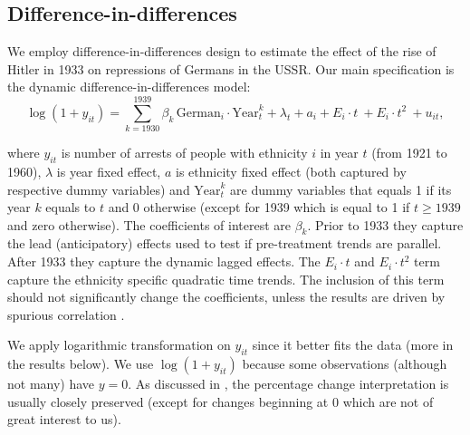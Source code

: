 \subsection{Difference-in-differences}
We employ difference-in-differences design to estimate the effect of the rise of Hitler in 1933 on repressions of Germans in the USSR. 
Our main specification is the dynamic difference-in-differences model:
\begin{equation}
 \log\left(1 + y_{it}\right) = \sum_{k= 1930}^{1939} \beta_k \, \text{German}_{i} \cdot \text{Year}_{t}^k + \lambda_t + a_i +  E_i \cdot t \:  + E_i \cdot t^2 \:    + u_{it},
 \label{eq:dynamic_did}
\end{equation}


where $y_{it}$ is number of arrests of people with ethnicity $i$ in year $t$ (from 1921 to 1960), $\lambda$ is year fixed effect, $a$ is ethnicity fixed effect (both captured by respective dummy variables) and  $\text{Year}_{t}^k$ are dummy variables that equals 1 if its year $k$ equals to $t$ and 0 otherwise (except for 1939 which is equal to 1 if $t \geq 1939$ and zero otherwise). The coefficients of interest are $\beta_k$. 
Prior to  1933 they capture the lead (anticipatory) effects  used to test if pre-treatment trends are parallel. After 1933 they capture the dynamic lagged effects.
The $ E_i \cdot t$ and $ E_i \cdot t^2$  term capture the ethnicity specific quadratic time trends. The inclusion of this term should not significantly  change the coefficients, unless the results are driven by spurious correlation \citep{angrist_mostly_2009}. 

 We apply logarithmic transformation on $y_{it}$ since it better fits the data (more in the results below).  We use $\log\left(1 + y_{it}\right)$ because some observations (although not many) have $y = 0$. As discussed in \citet[p. 193]{wooldridge_introductory_2015},  the percentage change interpretation is usually  closely preserved (except for changes beginning at 0 which are not of great interest to us).   

